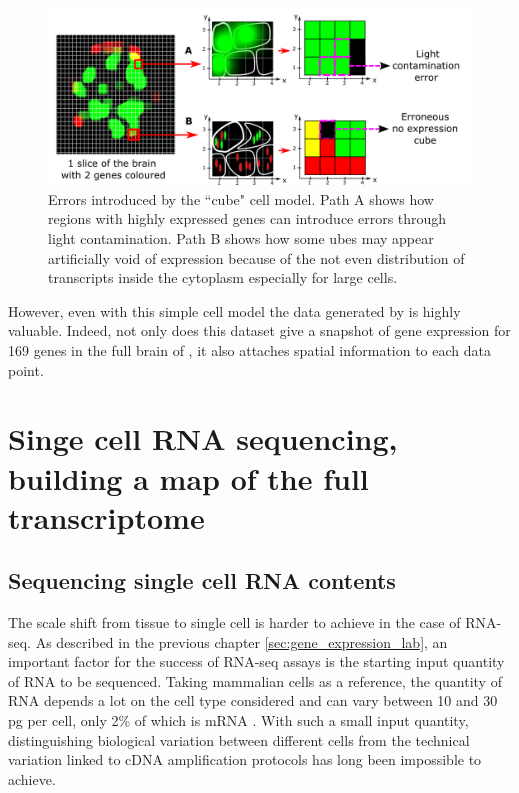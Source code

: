     \begin{figure}[h]
\centerline{\includegraphics[width=0.9\linewidth]{gfx/chapter2/cubeserrors.png}}
\caption{Errors introduced by the ``cube" cell model. Path A shows how regions with highly expressed genes can introduce errors through light contamination. Path B shows how some ubes may appear artificially void of expression because of the not even distribution of transcripts inside the cytoplasm especially for large cells.}\label{fig:cubeserrors}
	\end{figure}
	
	However, even with this simple cell model the data generated by \cite{Tomer10} is highly valuable. Indeed, not only does this dataset give a snapshot of gene expression for 169 genes in the full brain of \platy{}, it also attaches spatial information to each data point.\\

\section{Singe cell RNA sequencing, building a map of the full transcriptome}\label{sec:single_cell_rnaseq}
  \subsection{Sequencing single cell RNA contents}
	The scale shift from tissue to single cell is harder to achieve in the case of RNA-seq. As described in the previous chapter \ref{sec:gene_expression_lab}, an important factor for the success of RNA-seq assays is the starting input quantity of RNA to be sequenced. Taking mammalian cells as a reference, the quantity of RNA depends a lot on the cell type considered and can vary between 10 and 30 pg per cell, only 2\% of which is mRNA \cite{iscove02,islam11}. With such a small input quantity, distinguishing biological variation between different cells from the technical variation linked to cDNA amplification protocols has long been impossible to achieve.\\

